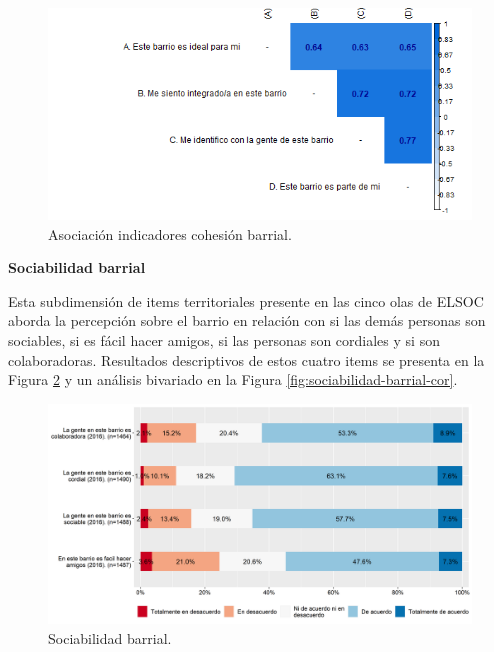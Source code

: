 \documentclass[
  12pt,
]{book}
\begin{document}
\begin{figure}[H]

{\centering \includegraphics[width=1\linewidth,height=1\textheight]{output/graphs/cohesion-barrial_cor} 

}

\caption{Asociación indicadores cohesión barrial.}\label{fig:cohesion-barrial-cor}
\end{figure}

\textbf{Sociabilidad barrial}

Esta subdimensión de items territoriales presente en las cinco olas de ELSOC aborda la percepción sobre el barrio en relación con si las demás personas son sociables, si es fácil hacer amigos, si las personas son cordiales y si son colaboradoras. Resultados descriptivos de estos cuatro items se presenta en la Figura \ref{fig:sociabilidad-barrial} y un análisis bivariado en la Figura \ref{fig:sociabilidad-barrial-cor}.

\begin{figure}[H]

{\centering \includegraphics[width=1\linewidth,height=1\textheight]{output/graphs/sociabilidad-barrial} 

}

\caption{Sociabilidad barrial.}\label{fig:sociabilidad-barrial}
\end{figure}
\end{document}
